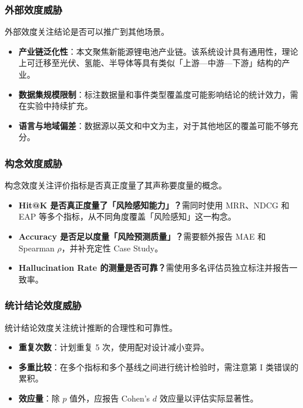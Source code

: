 \documentclass[12pt,a4paper]{article}
\newcommand{\term}[1]{\textbf{#1}}
\begin{document}
\subsubsection{外部效度威胁}

外部效度关注结论是否可以推广到其他场景。

\begin{itemize}
    \item \term{产业链泛化性}：本文聚焦新能源锂电池产业链。该系统设计具有通用性，理论上可迁移至光伏、氢能、半导体等具有类似「上游—中游—下游」结构的产业。
    \item \term{数据集规模限制}：标注数据量和事件类型覆盖度可能影响结论的统计效力，需在实验中持续扩充。
    \item \term{语言与地域偏差}：数据源以英文和中文为主，对于其他地区的覆盖可能不够充分。
\end{itemize}

\subsubsection{构念效度威胁}

构念效度关注评价指标是否真正度量了其声称要度量的概念。

\begin{itemize}
    \item \term{Hit@K 是否真正度量了「风险感知能力」？}需同时使用 MRR、NDCG 和 EAP 等多个指标，从不同角度覆盖「风险感知」这一构念。
    \item \term{Accuracy 是否足以度量「风险预测质量」？}需要额外报告 MAE 和 Spearman $\rho$，并补充定性 Case Study。
    \item \term{Hallucination Rate 的测量是否可靠？}需使用多名评估员独立标注并报告一致率。
\end{itemize}

\subsubsection{统计结论效度威胁}

统计结论效度关注统计推断的合理性和可靠性。

\begin{itemize}
    \item \term{重复次数}：计划重复 5 次，使用配对设计减小变异。
    \item \term{多重比较}：在多个指标和多个基线之间进行统计检验时，需注意第 I 类错误的累积。
    \item \term{效应量}：除 $p$ 值外，应报告 Cohen's $d$ 效应量以评估实际显著性。
\end{itemize}
\end{document}
